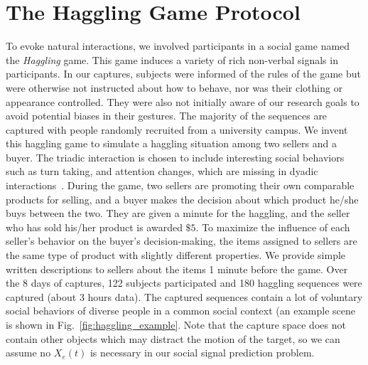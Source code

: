 \section{The Haggling Game Protocol}
To evoke natural interactions, we involved participants in a social game named the \emph{Haggling} game. This game induces a variety of rich non-verbal signals in participants. In our captures, subjects were informed of the rules of the game but were otherwise not instructed about how to behave, nor was their clothing or appearance controlled. They were also not initially aware of our research goals to avoid potential biases in their gestures. The majority of the sequences are captured with people randomly recruited from a university campus. We invent this haggling game to simulate a haggling situation among two sellers and a buyer. The triadic interaction is chosen to include interesting social behaviors such as turn taking, and attention changes, which are missing in dyadic interactions~\cite{rehg2013decoding}. During the game, two sellers are promoting their own comparable products for selling, and a buyer makes the decision about which product he/she buys between the two. They are given a minute for the haggling, and the seller who has sold his/her product is awarded $\$5$. To maximize the influence of each seller's behavior on the buyer's decision-making, the items assigned to sellers are the same type of product with slightly different properties. We provide simple written descriptions to sellers about the items 1 minute before the game. Over the 8 days of captures, 122 subjects participated and 180 haggling sequences were captured (about 3 hours data). The captured sequences contain a lot of voluntary social behaviors of diverse people in a common social context (an example scene is shown in Fig.~\ref{fig:haggling_example}. Note that the capture space does not contain other objects which may distract the motion of the target, so we can assume no $X_e(t)$ is necessary in our social signal prediction problem.







